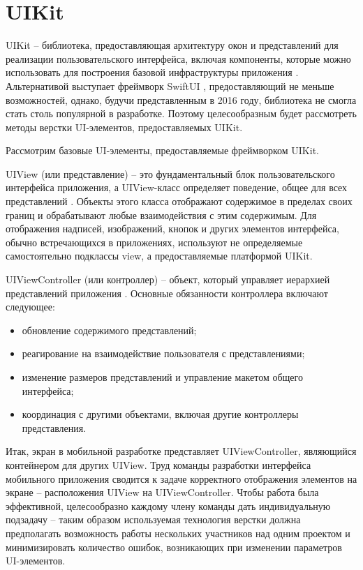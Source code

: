 \section{UIKit}

UIKit -- библиотека, предоставляющая архитектуру окон и представлений для реализации пользовательского интерфейса, включая компоненты, которые можно использовать для построения базовой инфраструктуры приложения \cite{uikit}. Альтернативой выступает фреймворк SwiftUI \cite{swiftui}, предоставляющий не меньше возможностей, однако, будучи представленным в 2016 году, библиотека не смогла стать столь популярной в разработке. Поэтому целесообразным будет рассмотреть методы верстки UI-элементов, предоставляемых UIKit.


Рассмотрим базовые UI-элементы, предоставляемые фреймворком UIKit.

UIView (или представление) -- это фундаментальный блок пользовательского интерфейса приложения, а UIView-класс определяет поведение, общее для всех представлений \cite{uiview}. Объекты этого класса отображают содержимое в пределах своих границ и обрабатывают любые взаимодействия с этим содержимым. Для отображения надписей, изображений, кнопок и других элементов интерфейса, обычно встречающихся в приложениях, используют не определяемые самостоятельно подклассы view, а предоставляемые платформой UIKit. 

UIViewController (или контроллер) -- объект, который управляет иерархией представлений приложения \cite{controller}. Основные обязанности контроллера включают следующее:

\begin{itemize}
	\item обновление содержимого представлений;
	\item реагирование на взаимодействие пользователя с представлениями;
	\item изменение размеров представлений и управление макетом общего интерфейса;
	\item координация с другими объектами, включая другие контроллеры представления.
\end{itemize}

Итак, экран в мобильной разработке представляет UIViewController, являющийся контейнером для других UIView. Труд команды разработки интерфейса мобильного приложения сводится к задаче корректного отображения элементов на экране -- расположения UIView на UIViewController. Чтобы работа была эффективной, целесообразно каждому члену команды дать индивидуальную подзадачу -- таким образом используемая технология верстки должна предполагать возможность работы нескольких участников над одним проектом и минимизировать количество ошибок, возникающих при изменении параметров UI-элементов. 


